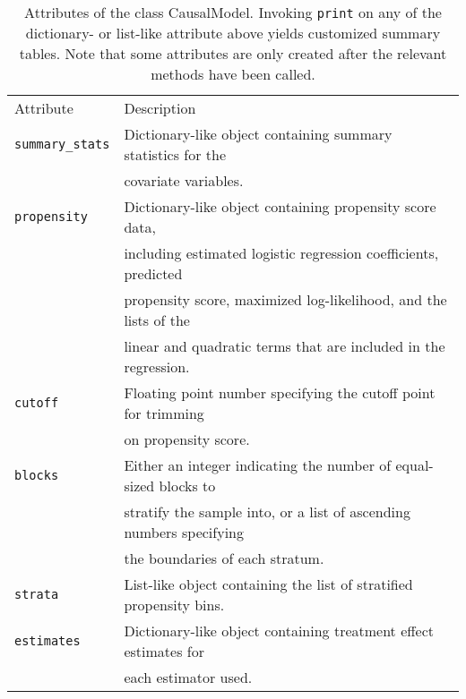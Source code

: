 \documentclass[12pt]{article}
\theoremstyle{definition}
\theoremstyle{definition}
\theoremstyle{definition}
\theoremstyle{remark}
\begin{document}
\begin{table}[h]
\begin{center}\begin{tabular}{ll}
Attribute & Description \\
\texttt{summary\_stats} & Dictionary-like object containing summary statistics for the \\
& covariate variables. \\
\texttt{propensity} & Dictionary-like object containing propensity score data, \\
& including estimated logistic regression coefficients, predicted \\
& propensity score, maximized log-likelihood, and the lists of the \\
& linear and quadratic terms that are included in the regression. \\
\texttt{cutoff} & Floating point number specifying the cutoff point for trimming \\
& on propensity score.\\
\texttt{blocks} & Either an integer indicating the number of equal-sized blocks to \\
& stratify the sample into, or a list of ascending numbers specifying \\
& the boundaries of each stratum. \\
\texttt{strata} & List-like object containing the list of stratified propensity bins. \\
\texttt{estimates} & Dictionary-like object containing treatment effect estimates for \\
& each estimator used.
\end{tabular}\end{center}
\caption{Attributes of the class CausalModel. Invoking \texttt{print} on any of the dictionary- or list-like attribute above yields customized summary tables. Note that some attributes are only created after the relevant methods have been called.}  \label{tab.a}
\end{table}
\end{document}
